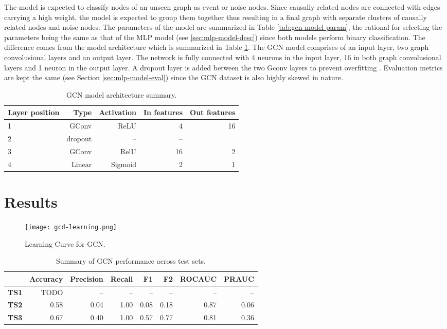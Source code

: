 The model is expected to classify nodes of an unseen graph as event or
noise nodes. Since causally related nodes are connected with edges
carrying a high weight, the model is expected to group them together
thus resulting in a final graph with separate clusters of causally
related nodes and noise nodes. The parameters of the model are
summarized in Table \ref{tab:gcn-model-param}, the rational for
selecting the parameters being the same as that of the MLP model (see
\ref{sec:mlp-model-desc}) since both models perform binary
classification. The difference comes from the model architecture which
is summarized in Table \ref{tab:gcn-model-arch}. The GCN model
comprises of an input layer, two graph convolusional layers and an
output layer. The network is fully connected with 4 neurons in the
input layer, 16 in both graph convolusional layers and 1 neuron in the
output layer. A dropout layer is added between the two Gconv layers to
prevent overfitting \cite{srivastava14dropout}. Evaluation metrics are
kept the same (see Section \ref{sec:mlp-model-eval}) since the GCN
dataset is also highly skewed in nature.

\begin{table}
  \caption{GCN model architecture summary.}
  \begin{tabular}{lrrrr}
    \hline
    Layer position & Type & Activation & In features & Out features \\
    \hline
    1 & GConv & ReLU & 4 & 16 \\
    2 & dropout & -- & -- \\
    3 & GConv & RelU & 16 & 2 \\
    4 & Linear & Sigmoid & 2 & 1 \\
    \hline
  \end{tabular}
  \label{tab:gcn-model-arch}
\end{table}

\section{Results}
\label{sec:gcd-disc}

\begin{figure}[htb]
  \centering
    \texttt{[image: gcd-learning.png]}
    \caption{Learning Curve for GCN.}
  \label{fig:gcn-learning}
\end{figure}

\begin{table}[htb]
  \centering
  \caption{Summary of GCN performance across test sets.}
  \begin{tabular}{lrrrrrrr}
    \hline
    & Accuracy & Precision & Recall & F1 & F2 & ROCAUC & PRAUC \\
    \hline
    \textbf{TS1} & TODO & -- & -- & -- & -- & -- & -- \\
    \textbf{TS2} & 0.58 & 0.04 & 1.00 & 0.08 & 0.18 & 0.87 & 0.06 \\
    \textbf{TS3} & 0.67 & 0.40 & 1.00 & 0.57 & 0.77 & 0.81 & 0.36 \\
    \hline
  \end{tabular}
  \label{tab:gcn-results}
\end{table}

